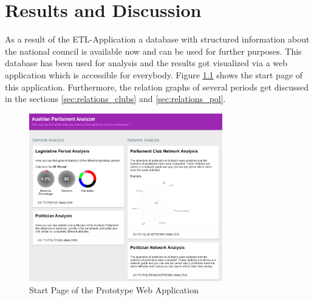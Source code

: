 \chapter{Results and Discussion}
\label{chap:evaluation}

As a result of the ETL-Application a database with structured information about the national council is available now and can be used for further purposes. This database has been used for analysis and the results got visualized via a web application which is accessible for everybody. Figure \ref{fig:start_page_prototype} shows the start page of this application. Furthermore, the relation graphs of several periods get discussed in the sections \ref{sec:relations_clubs} and \ref{sec:relations_pol}. 

\begin{figure}
	\center
	\includegraphics[width=0.75\textwidth]{imgs/result_start_page}
	\caption{Start Page of the Prototype Web Application}
	\label{fig:start_page_prototype}
\end{figure}

